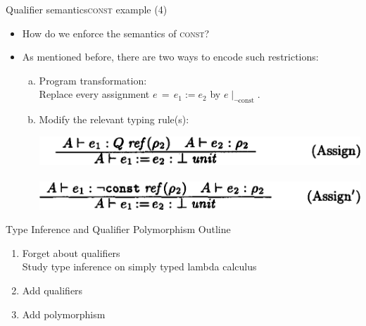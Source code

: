 \documentclass{beamer}
\begin{document}
\begin{frame}{Qualifier semantics}{\textsc{const} example (4)}
  \begin{itemize}
  \item How do we enforce the semantics of \textsc{const}?
  \item<2-> As mentioned before, there are two ways to encode such restrictions:
    \begin{enumerate}[a)]
    \item<2-> Program transformation:\\ Replace every assignment $e\,=\,e_1\!:=\!e_2$ by $e\!\mid_{\neg\text{const}}$.
    \item<3-> Modify the relevant typing rule(s):\\
      \begin{center}
      \includegraphics[scale=0.25]{paper_assign_original.png}\\
      \vspace{0.5em}{\Huge $\Downarrow$}\hspace{5.8em}\vspace{0.5em}\\
      \includegraphics[scale=0.25]{paper_assign_adapted.png}
      \end{center}
    \end{enumerate}
  \end{itemize}
\end{frame}



\begin{frame}{Type Inference and Qualifier Polymorphism}
Outline
\begin{enumerate}
\item Forget about qualifiers\\
Study type inference on simply typed lambda calculus
\item Add qualifiers
\item Add polymorphism
\end{enumerate}
\end{frame}
\end{document}
